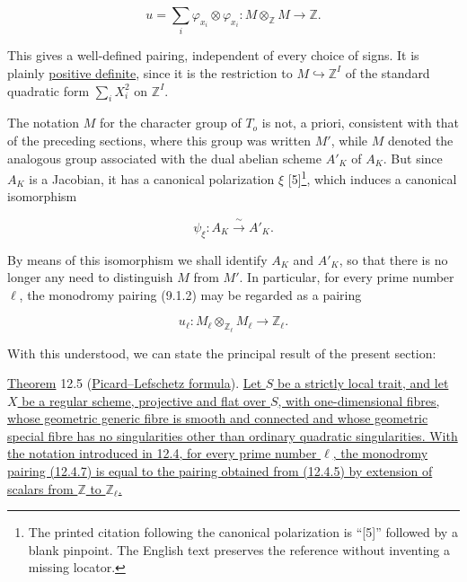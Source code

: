 \begin{equation}\tag{12.4.5}
 u=\sum_i\varphi_{x_i}\otimes\varphi_{x_i}:
 M\otimes_{\mathbb Z}M\longrightarrow\mathbb Z.
\end{equation}

This gives a well-defined pairing, independent of every choice of
signs. It is plainly \underline{positive definite}, since it is the
restriction to $M\hookrightarrow\mathbb Z^I$ of the standard quadratic
form $\sum_i X_i^2$ on $\mathbb Z^I$.

The notation $M$ for the character group of $T_o$ is not, a priori,
consistent with that of the preceding sections, where this group was
written $M'$, while $M$ denoted the analogous group associated with the
dual abelian scheme $A'_K$ of $A_K$. But since $A_K$ is a Jacobian, it
has a canonical polarization $\xi$ [5]\footnote{The printed citation
following the canonical polarization is ``[5]'' followed by a blank
pinpoint. The English text preserves the reference without inventing a
missing locator.}, which induces a canonical
isomorphism

\begin{equation}\tag{12.4.6}
 \psi_\xi:A_K\xrightarrow{\ \sim\ }A'_K.
\end{equation}

\noindent
By means of this isomorphism we shall identify $A_K$ and $A'_K$, so that
there is no longer any need to distinguish $M$ from $M'$. In particular,
for every prime number $\ell$, the monodromy pairing (9.1.2) may be
regarded as a pairing

\begin{equation}\tag{12.4.7}
 u_\ell:M_\ell\otimes_{\mathbb Z_\ell}M_\ell
 \longrightarrow\mathbb Z_\ell.
\end{equation}

With this understood, we can state the principal result of the present
section:

\medskip
\noindent
\underline{Theorem} 12.5 (\underline{Picard--Lefschetz formula}).
\underline{Let $S$ be a strictly local trait, and let $X$ be a regular
scheme, projective and flat over $S$, with one-dimensional fibres, whose
geometric generic fibre is smooth and connected and whose geometric
special fibre has no singularities other than ordinary quadratic
singularities. With the notation introduced in 12.4, for every prime
number $\ell$, the monodromy pairing (12.4.7) is equal to the pairing
obtained from (12.4.5) by extension of scalars from $\mathbb Z$ to
$\mathbb Z_\ell$.}
